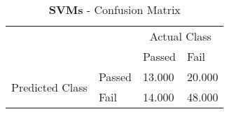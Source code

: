\documentclass[12pt]{article}
\begin{document}
\setlength{\extrarowheight}{1.5pt}
\begin{table}[!htbp]
\caption{\textbf{SVMs} - Confusion Matrix} %
\centering %
\begin{tabular}{ |l|l|p{3cm}|p{3cm}| }
\hline %
\multirow{2}{*}{} & & \multicolumn{2}{c|}{Actual Class} \\ 
\cline{3-4}
\multirow{2}{*}{} & & Passed & Fail \\ 
\hline
\multirow{2}{1.5in}{Predicted Class} & Passed & 13.000 & 20.000 \\ 
 & Fail & 14.000 & 48.000  \\ \hline
\end{tabular}
\end{table}
\end{document}
